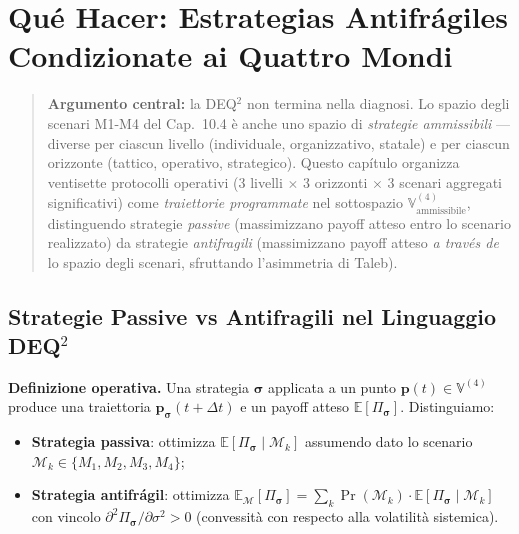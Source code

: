 \chapter{Qué Hacer: Estrategias Antifrágiles Condizionate ai Quattro
Mondi}\label{cosa-fare-strategie-antifragili-condizionate-ai-quattro-mondi}

\begin{quote}
\textbf{Argumento central:} la DEQ$^2$ non termina nella diagnosi. Lo
spazio degli scenari M1-M4 del Cap.~10.4 è anche uno spazio di
\emph{strategie ammissibili} --- diverse per ciascun livello
(individuale, organizzativo, statale) e per ciascun orizzonte (tattico,
operativo, strategico). Questo capítulo organizza ventisette protocolli
operativi (3 livelli $\times$ 3 orizzonti $\times$ 3 scenari aggregati significativi)
come \emph{traiettorie programmate} nel sottospazio
\(\mathbb{V}^{(4)}_{\text{ammissibile}}\), distinguendo strategie
\emph{passive} (massimizzano payoff atteso entro lo scenario realizzato)
da strategie \emph{antifragili} (massimizzano payoff atteso
\emph{a través de} lo spazio degli scenari, sfruttando l'asimmetria di
Taleb).
\end{quote}



\section{Strategie Passive vs Antifragili nel Linguaggio
DEQ$^2$}\label{strategie-passive-vs-antifragili-nel-linguaggio-dequxb2}

\Hypoth{} \textbf{Definizione operativa.} Una strategia
\(\boldsymbol{\sigma}\) applicata a un punto
\(\boldsymbol{p}(t) \in \mathbb{V}^{(4)}\) produce una traiettoria
\(\boldsymbol{p}_{\boldsymbol{\sigma}}(t+\Delta t)\) e un payoff atteso
\(\mathbb{E}[\Pi_{\boldsymbol{\sigma}}]\). Distinguiamo:

\begin{itemize}
\tightlist
\item
  \textbf{Strategia passiva}: ottimizza
  \(\mathbb{E}[\Pi_{\boldsymbol{\sigma}} \mid \mathcal{M}_k]\) assumendo
  dato lo scenario \(\mathcal{M}_k \in \{M_1, M_2, M_3, M_4\}\);
\item
  \textbf{Strategia antifrágil}: ottimizza
  \(\mathbb{E}_{\mathcal{M}}[\Pi_{\boldsymbol{\sigma}}] = \sum_k \Pr(\mathcal{M}_k) \cdot \mathbb{E}[\Pi_{\boldsymbol{\sigma}} \mid \mathcal{M}_k]\)
  con vincolo
  \(\partial^2 \Pi_{\boldsymbol{\sigma}} / \partial \sigma^2 > 0\)
  (convessità con respecto alla volatilità sistemica).
\end{itemize}

